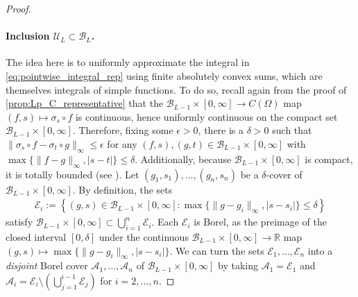 \documentclass{article}
\def\cA{{\mathcal{A}}}
\def\cB{{\mathcal{B}}}
\def\cE{{\mathcal{E}}}
\def\cU{{\mathcal{U}}}
\newcommand{\R}{\mathbb{R}}
\begin{document}
\begin{appendices}
\begin{proof}
\paragraph{Inclusion $\cU_L \subset \cB_L$.} The idea here is to uniformly approximate  the integral in \eqref{eq:pointwise_integral_rep} using finite absolutely convex sums, which are themselves integrals of simple functions. To do so, recall again from the proof of \cref{prop:Lp_C_representative} that the $\cB_{L-1} \times [0,\infty] \to C(\Omega)$ map $(f,s) \mapsto \sigma_s \circ f$ is continuous, hence uniformly continuous on the compact set $\cB_{L-1} \times [0,\infty]$. Therefore, fixing some $\epsilon > 0$, there is a $\delta > 0$ such that $\| \sigma_s \circ f - \sigma_t \circ g \|_\infty \leq \epsilon$ for any $(f,s), (g,t) \in \cB_{L-1}  \times [0,\infty]$ with $\max\{ \| f - g \|_\infty, |s-t| \} \leq \delta$. Additionally, because $\cB_{L-1} \times [0,\infty]$ is compact, it is totally bounded (see ). Let $(g_1, s_1), \dots, (g_n, s_n)$ be a $\delta$-cover of $\cB_{L-1} \times [0,\infty]$. By definition, the sets
\begin{align}
    \cE_i := \left\{ (g,s) \in  \cB_{L-1} \times [0,\infty]: \max\{ \| g - g_i \|_\infty, |s-s_i| \} \leq \delta\right\}
\end{align}
satisfy $\cB_{L-1} \times [0,\infty] \subset \bigcup_{i=1}^n \cE_i$. Each $\cE_i$ is Borel, as the preimage of the closed interval $[0, \delta]$ under the continuous $\cB_{L-1} \times [0,\infty] \to \R$ map $(g,s) \mapsto \max\{ \| g - g_i \|_\infty, |s-s_i| \}$. We can turn the sets $\cE_1, \dots, \cE_n$ into a \textit{disjoint} Borel cover $\cA_1, \dots, \cA_n$ of $\cB_{L-1} \times [0,\infty]$ by taking $\cA_1 = \cE_1$ and $\cA_i = \cE_i \setminus \left( \bigcup_{j=1}^{i-1} \cE_j \right)$ for $i=2, \dots, n$.


\end{proof}
\end{appendices}
\end{document}
